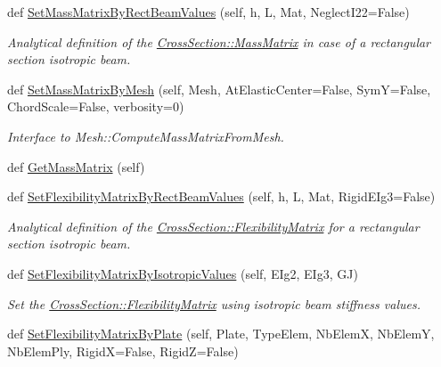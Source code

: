 \begin{DoxyCompactItemize}
def \hyperlink{classgebtaero_1_1_cross_section_1_1_cross_section_a7fa57a9ed49c1029409a78f45a45c562}{Set\+Mass\+Matrix\+By\+Rect\+Beam\+Values} (self, h, L, Mat, Neglect\+I22=False)
\begin{DoxyCompactList}\small\item\em Analytical definition of the \hyperlink{classgebtaero_1_1_cross_section_1_1_cross_section_ae9be8649853163b2b4dfdaa3584d9f78}{Cross\+Section\+::\+Mass\+Matrix} in case of a rectangular section isotropic beam. \end{DoxyCompactList}\item 
def \hyperlink{classgebtaero_1_1_cross_section_1_1_cross_section_a51f5f560da9f747310ebc55db72fd353}{Set\+Mass\+Matrix\+By\+Mesh} (self, Mesh, At\+Elastic\+Center=False, SymY=False, Chord\+Scale=False, verbosity=0)
\begin{DoxyCompactList}\small\item\em Interface to Mesh\+::\+Compute\+Mass\+Matrix\+From\+Mesh. \end{DoxyCompactList}\item 
def \hyperlink{classgebtaero_1_1_cross_section_1_1_cross_section_a329e4ccf313b33bf8fd5a1af65d95d0f}{Get\+Mass\+Matrix} (self)
\item 
def \hyperlink{classgebtaero_1_1_cross_section_1_1_cross_section_ae470ab0c1773947882a762c5e36351d5}{Set\+Flexibility\+Matrix\+By\+Rect\+Beam\+Values} (self, h, L, Mat, Rigid\+E\+Ig3=False)
\begin{DoxyCompactList}\small\item\em Analytical definition of the \hyperlink{classgebtaero_1_1_cross_section_1_1_cross_section_ac20eafaf38ff757f9a8c9ae89212396a}{Cross\+Section\+::\+Flexibility\+Matrix} for a rectangular section isotropic beam. \end{DoxyCompactList}\item 
def \hyperlink{classgebtaero_1_1_cross_section_1_1_cross_section_a8e1902ba4dd5fbdb184868b55b663ebc}{Set\+Flexibility\+Matrix\+By\+Isotropic\+Values} (self, E\+Ig2, E\+Ig3, GJ)
\begin{DoxyCompactList}\small\item\em Set the \hyperlink{classgebtaero_1_1_cross_section_1_1_cross_section_ac20eafaf38ff757f9a8c9ae89212396a}{Cross\+Section\+::\+Flexibility\+Matrix} using isotropic beam stiffness values. \end{DoxyCompactList}\item 
def \hyperlink{classgebtaero_1_1_cross_section_1_1_cross_section_a1f7fe7afe016bebd24eb42a7199df862}{Set\+Flexibility\+Matrix\+By\+Plate} (self, Plate, Type\+Elem, Nb\+ElemX, Nb\+ElemY, Nb\+Elem\+Ply, RigidX=False, RigidZ=False)

\end{DoxyCompactItemize}
